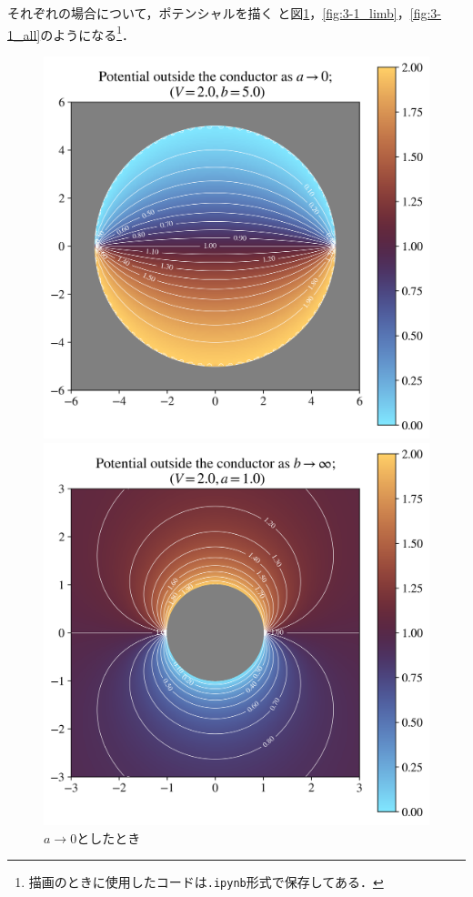 それぞれの場合について，ポテンシャルを描く
と図\ref{fig:3-1_lima}，\ref{fig:3-1_limb}，\ref{fig:3-1_all}のようになる\footnote{
  描画のときに使用したコードは\texttt{.ipynb}形式で保存してある．
  }．
  \begin{figure}[htbp]%
    \centering%
    \begin{minipage}{0.30\linewidth}
      \centering
      \includegraphics[width=\linewidth]{py/3-1_lima.png}%
      \caption{$a \to 0$としたとき}%
      \label{fig:3-1_lima}%
    \end{minipage}
    \begin{minipage}{0.30\linewidth}
      \centering
      \includegraphics[width=\linewidth]{py/3-1_limb.png}%

\end{minipage}
\end{figure}
